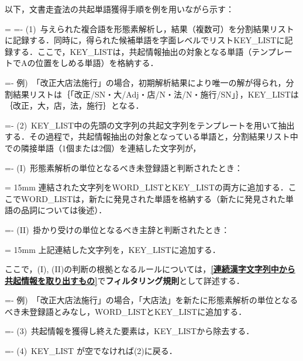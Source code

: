 以下，文書走査法の共起単語獲得手順を例を用いながら示す：

\newlength{\originalparindent}
\originalparindent=\parindent
\settowidth{\leftskip}{(1)\ }
\settowidth{\parindent}{(1)\ }
\parindent=-\parindent
(1)\ 与えられた複合語を形態素解析し，結果（複数可）を分割結果リストに記録する．同時に，得られた候補単語を字面レベルでリストKEY\_LISTに記録する．ここで，KEY\_LISTは，共起情報抽出の対象となる単語（テンプレートでAの位置をしめる単語）を格納する．

\settowidth{\parindent}{例)\ }
\parindent=-\parindent
例)\ 「改正大店法施行」の場合，初期解析結果により唯一の解が得られ，分割結果リストは｛「改正/SN・大/Adj・店/N・法/N・施行/SN」｝，KEY\_LISTは｛改正，大，店，法，施行｝となる．

\settowidth{\leftskip}{(2)\ }
\settowidth{\parindent}{(2)\ }
\parindent=-\parindent
(2)\ KEY\_LIST中の先頭の文字列の共起文字列をテンプレートを用いて抽出する．その過程で，共起情報抽出の対象となっている単語と，分割結果リスト中での隣接単語（1個または2個）を連結した文字列が，

\settowidth{\leftskip}{(2)\ (I)\ }
\settowidth{\parindent}{(I)\ }
\parindent=-\parindent
(I)\ 形態素解析の単位となるべき未登録語と判断されたとき：

\settowidth{\leftskip}{(2)\ (I)\ }
\noindent
\rightskip = 15mm
連結された文字列をWORD\_LISTとKEY\_LISTの両方に追加する．ここでWORD\_LISTは，新たに発見された単語を格納する（新たに発見された単語の品詞については後述）．

\settowidth{\leftskip}{(2)\ (I)\ }
\settowidth{\parindent}{(II)\ }
\parindent=-\parindent
(II)\ 掛かり受けの単位となるべき主辞と判断されたとき：

\settowidth{\leftskip}{(2)\ (I)\ }
\noindent
\rightskip = 15mm
上記連結した文字列を，KEY\_LISTに追加する．

\settowidth{\leftskip}{(2)\ }
\noindent
ここで，(I), (II)の判断の根拠となるルールについては，{\bf \ref{連続漢字文字列中から共起情報を取り出すもの}}で{\bf フィルタリング規則}として詳述する．

\settowidth{\parindent}{例)\ }
\parindent=-\parindent
例)\ 「改正大店法施行」の場合，「大店法」を新たに形態素解析の単位となるべき未登録語とみなし，WORD\_LISTとKEY\_LISTに追加する．

\settowidth{\leftskip}{(3)\ }
\settowidth{\parindent}{(3)\ }
\parindent=-\parindent
(3)\ 共起情報を獲得し終えた要素は，KEY\_LISTから除去する．

\settowidth{\leftskip}{(4)\ }
\settowidth{\parindent}{(4)\ }
\parindent=-\parindent
(4)\ KEY\_LIST が空でなければ(2)に戻る．

